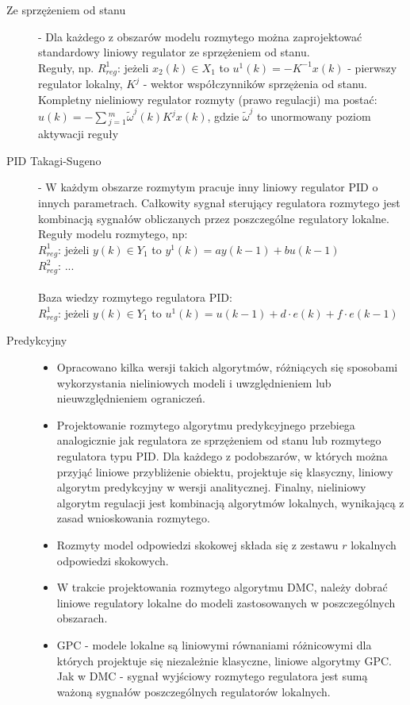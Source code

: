 \begin{description}
    \item[Ze sprzężeniem od stanu] - Dla każdego z obszarów modelu rozmytego można zaprojektować standardowy liniowy regulator ze sprzężeniem od stanu.\\ Reguły, np. $R_{reg}^1$: jeżeli $x_2(k) \in X_1$ to $u^1(k) = -K^{-1}x(k)$ - pierwszy regulator lokalny, $K^j$ - wektor współczynników sprzężenia od stanu.\\Kompletny nieliniowy regulator rozmyty (prawo regulacji) ma postać: $u(k) = -\sum{}_{j=1}^m\tilde{\omega}^j(k)K^jx(k)$, gdzie $\tilde{\omega}^j$ to unormowany poziom aktywacji reguły
    \item[PID Takagi-Sugeno] - W każdym obszarze rozmytym pracuje inny liniowy regulator PID o innych parametrach. Całkowity sygnał sterujący regulatora rozmytego jest kombinacją sygnałów obliczanych przez poszczególne regulatory lokalne.\\Reguły modelu rozmytego, np:\\$R_{reg}^1$: jeżeli $y(k) \in Y_1$ to $y^1(k) = ay(k-1)+bu(k-1)$\\$R_{reg}^2$: ...\\\\Baza wiedzy rozmytego regulatora PID: \\$R_{reg}^1$: jeżeli $y(k) \in Y_1$ to $u^1(k) = u(k-1)+d\cdot{}e(k)+f\cdot{}e(k-1)$
    \item[Predykcyjny]\mbox{}
    \begin{itemize}
        \item Opracowano kilka wersji takich algorytmów, różniących się sposobami wykorzystania nieliniowych modeli i uwzględnieniem lub nieuwzględnieniem ograniczeń.
        \item Projektowanie rozmytego algorytmu predykcyjnego przebiega analogicznie jak regulatora ze sprzężeniem od stanu lub rozmytego regulatora typu PID. Dla każdego z podobszarów, w których można przyjąć liniowe przybliżenie obiektu, projektuje się klasyczny, liniowy algorytm predykcyjny w wersji analitycznej. Finalny, nieliniowy algorytm regulacji jest kombinacją algorytmów lokalnych, wynikającą z zasad wnioskowania rozmytego.
        \item Rozmyty model odpowiedzi skokowej składa się z zestawu $r$ lokalnych odpowiedzi skokowych.
        \item W trakcie projektowania rozmytego algorytmu DMC, należy dobrać liniowe regulatory lokalne do modeli zastosowanych w poszczególnych obszarach.
        \item GPC - modele lokalne są liniowymi równaniami różnicowymi dla których projektuje się niezależnie klasyczne, liniowe algorytmy GPC. Jak w DMC - sygnał wyjściowy rozmytego regulatora jest sumą ważoną sygnałów poszczególnych regulatorów lokalnych.
    \end{itemize}
\end{description}


